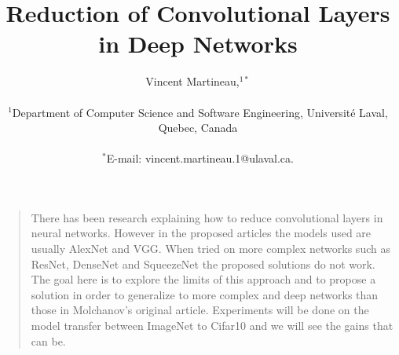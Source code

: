 \documentclass[12pt]{article}
\title{Reduction of Convolutional Layers in Deep Networks}
\author
{Vincent Martineau,$^{1\ast}$\\
\\
\normalsize{$^{1}$Department of Computer Science and Software Engineering, Université Laval, Quebec, Canada}\\
\\
\normalsize{$^\ast$E-mail:  vincent.martineau.1@ulaval.ca.}
}
\date{}
\newenvironment{sciabstract}{%
\begin{quote} \bf}
{\end{quote}}
\begin{document}
 


\baselineskip24pt


\maketitle 




\begin{sciabstract}
  
  There has been research explaining how to reduce convolutional layers in neural networks. However in the proposed articles the models used are usually AlexNet and VGG. When tried on more complex networks such as ResNet, DenseNet and SqueezeNet the proposed solutions do not work. The goal here is to explore the limits of this approach and to propose a solution in order to generalize to more complex and deep networks than those in Molchanov's original article. Experiments will be done on the model transfer between ImageNet to Cifar10 and we will see the gains that can be.
\end{sciabstract}



\end{document}
